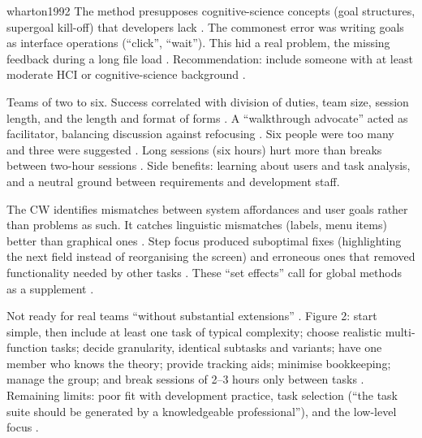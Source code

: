 \begin{papercard}{wharton1992}
 The method presupposes cognitive-science concepts (goal structures, supergoal kill-off) that developers lack . The commonest error was writing goals as interface operations (``click'', ``wait''). This hid a real problem, the missing feedback during a long file load . Recommendation: include someone with at least moderate HCI or cognitive-science background .

 Teams of two to six. Success correlated with division of duties, team size, session length, and the length and format of forms . A ``walkthrough advocate'' acted as facilitator, balancing discussion against refocusing . Six people were too many and three were suggested . Long sessions (six hours) hurt more than breaks between two-hour sessions . Side benefits: learning about users and task analysis, and a neutral ground between requirements and development staff.

 The CW identifies mismatches between system affordances and user goals rather than problems as such. It catches linguistic mismatches (labels, menu items) better than graphical ones . Step focus produced suboptimal fixes (highlighting the next field instead of reorganising the screen) and erroneous ones that removed functionality needed by other tasks . These ``set effects'' call for global methods as a supplement .

 Not ready for real teams ``without substantial extensions'' . Figure 2: start simple, then include at least one task of typical complexity; choose realistic multi-function tasks; decide granularity, identical subtasks and variants; have one member who knows the theory; provide tracking aids; minimise bookkeeping; manage the group; and break sessions of 2--3 hours only between tasks . Remaining limits: poor fit with development practice, task selection (``the task suite should be generated by a knowledgeable professional''), and the low-level focus .


\end{papercard}

